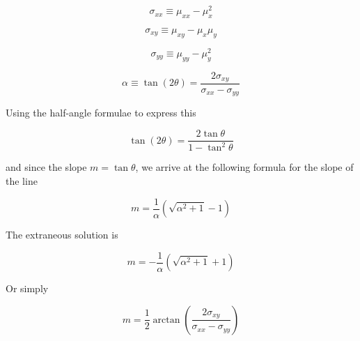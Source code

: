 \documentclass{article}
\newcommand{\meanx}{\ensuremath{\mu_{x}}}
\newcommand{\meanxsquared}{\ensuremath{\mu_{x}^{2}}}
\newcommand{\meany}{\ensuremath{\mu_{y}}}
\newcommand{\meanysquared}{\ensuremath{\mu_{y}^{2}}}
\newcommand{\meanxx}{\ensuremath{\mu_{xx}}}
\newcommand{\meanxy}{\ensuremath{\mu_{xy}}}
\newcommand{\meanyy}{\ensuremath{\mu_{yy}}}
\newcommand{\sxx}{\ensuremath{\sigma_{xx}}}
\newcommand{\sxy}{\ensuremath{\sigma_{xy}}}
\newcommand{\syy}{\ensuremath{\sigma_{yy}}}
\begin{document}
\begin{equation}
\sxx \equiv \meanxx - {\meanxsquared}
\end{equation}

\begin{equation}
\sxy \equiv \meanxy - \meanx \meany
\end{equation}

\begin{equation}
\syy \equiv \meanyy - \meanysquared
\end{equation}

\begin{equation}
\alpha \equiv \tan \left( 2 \theta \right) = \frac{2 \sxy}{\sxx - \syy}
\end{equation}

Using the half-angle formulae to express this

\begin{equation}
\tan \left( 2 \theta \right) = \frac{2 \tan \theta}{1 - \tan^{2} \theta}
\end{equation}

and since the slope $m = \tan \theta $, we arrive at the following formula for the slope of the line

\begin{equation}
m = \frac{1}{\alpha} \left( \sqrt{\alpha^{2} + 1} - 1\right)
\end{equation}

The extraneous solution is

\begin{equation}
m = - \frac{1}{\alpha} \left( \sqrt{\alpha^{2} + 1} + 1\right)
\end{equation}

Or simply

\begin{equation}
m = \frac{1}{2} \arctan \left( \frac{2 \sxy}{\sxx - \syy} \right)
\end{equation}
\end{document}

